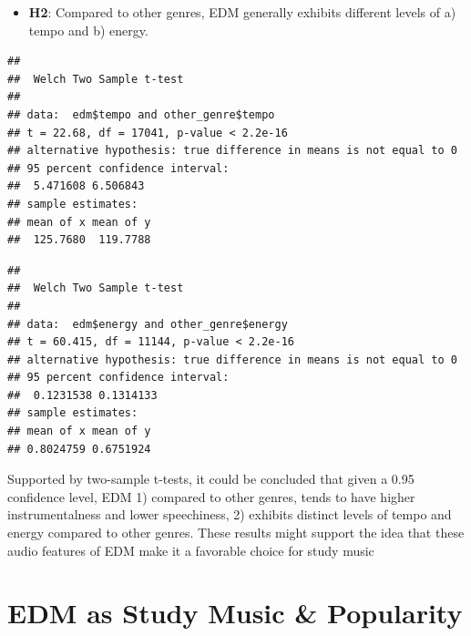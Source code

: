 \documentclass[
]{book}
\newenvironment{Shaded}{\begin{snugshade}}{\end{snugshade}}
\newcommand{\AttributeTok}[1]{\textcolor[rgb]{0.13,0.29,0.53}{#1}}
\newcommand{\ConstantTok}[1]{\textcolor[rgb]{0.56,0.35,0.01}{#1}}
\newcommand{\FunctionTok}[1]{\textcolor[rgb]{0.13,0.29,0.53}{\textbf{#1}}}
\newcommand{\NormalTok}[1]{#1}
\newcommand{\SpecialCharTok}[1]{\textcolor[rgb]{0.81,0.36,0.00}{\textbf{#1}}}
\providecommand{\tightlist}{%
  \setlength{\itemsep}{0pt}\setlength{\parskip}{0pt}}
\begin{document}
\begin{itemize}
\tightlist
\item
  \textbf{H2}: Compared to other genres, EDM generally exhibits different levels of a) tempo and b) energy.
\end{itemize}

\begin{Shaded}
\end{Shaded}

\begin{verbatim}
## 
##  Welch Two Sample t-test
## 
## data:  edm$tempo and other_genre$tempo
## t = 22.68, df = 17041, p-value < 2.2e-16
## alternative hypothesis: true difference in means is not equal to 0
## 95 percent confidence interval:
##  5.471608 6.506843
## sample estimates:
## mean of x mean of y 
##  125.7680  119.7788
\end{verbatim}

\begin{Shaded}
\end{Shaded}

\begin{verbatim}
## 
##  Welch Two Sample t-test
## 
## data:  edm$energy and other_genre$energy
## t = 60.415, df = 11144, p-value < 2.2e-16
## alternative hypothesis: true difference in means is not equal to 0
## 95 percent confidence interval:
##  0.1231538 0.1314133
## sample estimates:
## mean of x mean of y 
## 0.8024759 0.6751924
\end{verbatim}

Supported by two-sample t-tests, it could be concluded that given a 0.95 confidence level, EDM 1) compared to other genres, tends to have higher instrumentalness and lower speechiness, 2) exhibits distinct levels of tempo and energy compared to other genres. These results might support the idea that these audio features of EDM make it a favorable choice for study music

\hypertarget{edm-as-study-music-popularity}{%
\section{EDM as Study Music \& Popularity}\label{edm-as-study-music-popularity}}
\end{document}
